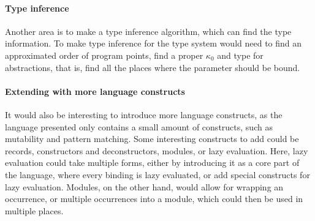 \documentclass[acmsmall,sigplan]{acmart}
\begin{document}
\paragraph{Type inference}
Another area is to make a type inference algorithm, which can find the type information.
To make type inference for the type system would need to find an approximated order of program points, find a proper $\kappa_0$ and type for abstractions, that is, find all the places where the parameter should be bound.

\paragraph{Extending with more language constructs}
It would also be interesting to introduce more language constructs, as the language presented only contains a small amount of constructs, such as mutability and pattern matching.
Some interesting constructs to add could be records, constructors and deconstructors, modules, or lazy evaluation.
Here, lazy evaluation could take multiple forms, either by introducing it as a core part of the language, where every binding is lazy evaluated, or add special constructs for lazy evaluation.
Modules, on the other hand, would allow for wrapping an occurrence, or multiple occurrences into a module, which could then be used in multiple places.



\end{document}
